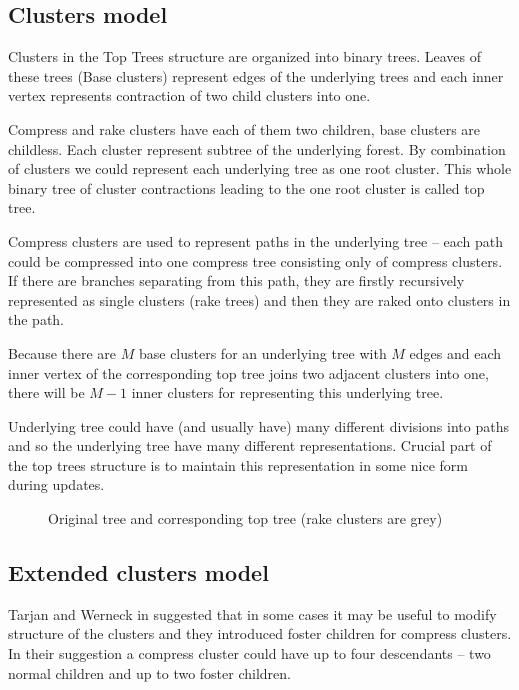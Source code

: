 \subsection{Clusters model}

Clusters in the Top Trees structure are organized into binary trees. Leaves of
these trees (Base clusters) represent edges of the underlying trees and each
inner vertex represents contraction of two child clusters into one.

Compress and rake clusters have each of them two children, base clusters are
childless. Each cluster represent subtree of the underlying forest. By
combination of clusters we could represent each underlying tree as one {\I root
cluster}. This whole binary tree of cluster contractions leading to the one root
cluster is called {\I top tree}.

Compress clusters are used to represent paths in the underlying tree -- each
path could be compressed into one {\I compress tree} consisting only of compress
clusters. If there are branches separating from this path, they are firstly
recursively represented as single clusters ({\I rake trees}) and then they are
{\I raked onto} clusters in the path.

Because there are $M$ base clusters for an underlying tree with $M$ edges and
each inner vertex of the corresponding top tree joins two adjacent clusters into
one, there will be $M-1$ inner clusters for representing this underlying tree.

Underlying tree could have (and usually have) many different divisions into
paths and so the underlying tree have many different representations. Crucial
part of the top trees structure is to maintain this representation in some nice
form during updates.

\begin{figure}[H]
\centering
{}
\caption{Original tree and corresponding top tree (rake clusters are grey)}
\end{figure}

\subsection{Extended clusters model}

Tarjan and Werneck in \cite{SelfAdjustingTT} suggested that in some cases it may
be useful to modify structure of the clusters and they introduced
{\I foster children} for {\I compress clusters}. In their suggestion a compress
cluster could have up to four descendants -- two normal children and up to two
foster children.

